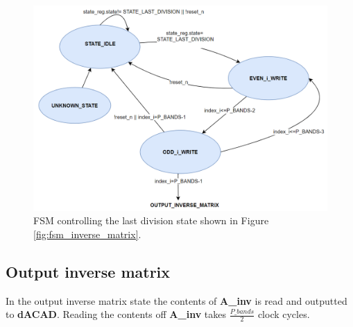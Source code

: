 \begin{figure}[H]
\centering
   \includegraphics[scale=0.3]{images/inverse_hw/fsm_last_division.PNG}
  \caption{FSM controlling the last division state shown in Figure \ref{fig:fsm_inverse_matrix}.  } 
  \label{fig:fsm_last_division}
\end{figure}


\subsection{Output inverse matrix}
In the output inverse matrix state the contents of \textbf{A\_inv} is read and outputted to \textbf{dACAD}. Reading the contents off \textbf{A\_inv} takes $\frac{P\_bands}{2}$ clock cycles. 

